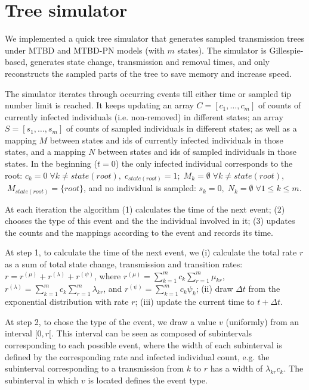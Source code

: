 \documentclass[a4paper,10pt]{article}
\begin{document}
\section{Tree simulator}
We implemented a quick tree simulator that generates sampled transmission trees under MTBD and MTBD-PN models (with $m$ states). The simulator is Gillespie-based, generates state change, transmission and removal times, and only reconstructs the sampled parts of the tree to save memory and increase speed. 

The simulator iterates through occurring events till either time or sampled tip number limit is reached. 
It keeps updating an array $C = [c_1, \ldots, c_m]$ of counts of currently infected individuals (i.e. non-removed) in different states; an array $S = [s_1, \ldots, s_m]$ of counts of sampled individuals in different states; as well as a mapping $M$ between states and ids of currently infected individuals in those states, and a mapping $N$ between states and ids of sampled individuals in those states.  In the beginning ($t=0$) the only infected individual corresponds to the root: $c_k = 0 \;\forall k \neq state(root), \;c_{state(root)} = 1; \;M_k = \emptyset \; \forall k \neq state(root)$, $ \; M_{state(root)} = \{root\}$, and no individual is sampled: $s_k=0,\;N_k = \emptyset \; \forall 1 \leq k \leq m$.

At each iteration the algorithm (1) calculates the time of the next event; (2) chooses the type of this event and the the individual involved in it; (3) updates the counts and the mappings according to the event and records its time.

At step 1, to calculate the time of the next event, we (i) calculate the total rate $r$ as a sum of total state change, transmission and transition rates: $r = r^{(\mu)} + r^{(\lambda)} + r^{(\psi)}$, where $r^{(\mu)} = \sum\limits_{k=1}^{m} c_k \sum\limits_{r=1}^{m} \mu_{kr}$, $r^{(\lambda)} = \sum\limits_{k=1}^{m} c_k \sum\limits_{r=1}^{m} \lambda_{kr}$, and $r^{(\psi)} = \sum\limits_{k=1}^{m} c_k \psi_{k}$; (ii) draw $\Delta t$ from the exponential distribution with rate $r$; (iii) update the current time to $t + \Delta t$.

At step 2, to chose the type of the event, we draw a value $v$ (uniformly) from an interval $[0, r[$. This interval can be seen as composed of subintervals corresponding to each possible event, where the width of each subinterval is defined by the corresponding rate and infected individual count, e.g. the subinterval corresponding to a transmission from $k$ to $r$ has a width of $\lambda_{kr}c_k$. The subinterval in which $v$ is located defines the event type.
\end{document}
